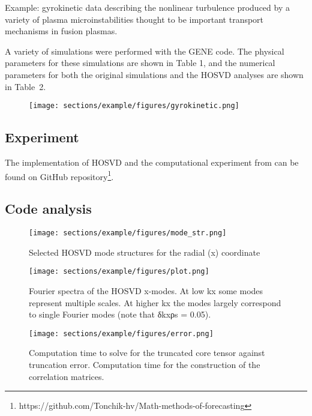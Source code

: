 \documentclass[GeometricDeepLearning/sections/Kurdyukova2021Lab8/main.tex]{subfiles}
\begin{document}
Example: gyrokinetic data describing the nonlinear turbulence produced by a variety of plasma microinstabilities thought to be important transport mechanisms in fusion plasmas.


A variety of simulations were performed with the GENE code. The physical parameters for these simulations are shown in Table 1, and the numerical parameters for both
the original simulations and the HOSVD analyses are shown in Table~2.

\begin{figure}[h]
\centering
\texttt{[image: sections/example/figures/gyrokinetic.png]}
\label{fig:example:1}
\end{figure}


\subsection{Experiment}
The implementation of HOSVD and the computational experiment from \cite{hatch2012analysis} can be found on GitHub repository\footnote{https://github.com/Tonchik-hv/Math-methods-of-forecasting}.

\subsection{Code analysis}

\begin{figure}[h]
\centering
\texttt{[image: sections/example/figures/mode\_str.png]}
\caption{Selected HOSVD mode structures for the radial (x) coordinate}
\label{fig:example:1}
\end{figure}

\begin{figure}[h]
\centering
\texttt{[image: sections/example/figures/plot.png]}
\caption{Fourier spectra of the HOSVD x-modes. At low kx some modes represent multiple scales. At higher kx the modes largely correspond to single Fourier modes (note that δkxρs = 0.05).}
\label{fig:example:1}
\end{figure}


\begin{figure}[h]
\centering
\texttt{[image: sections/example/figures/error.png]}
\caption{ Computation time to solve for the truncated core tensor against truncation error. Computation time for the construction of the correlation matrices.}
\label{fig:example:1}
\end{figure}
\end{document}
